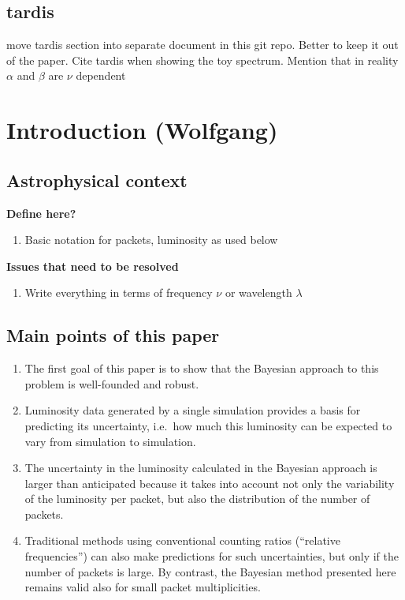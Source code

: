 \documentclass[11pt]{article}
\begin{document}
\subsection{tardis}

move tardis section into separate document in this git repo. Better to keep it out of the paper. Cite tardis when showing the toy spectrum. Mention that in reality $\alpha$ and $\beta$ are $\nu$ dependent

\section{Introduction (Wolfgang)}

\subsection{Astrophysical context}

\textbf{Define here?}
\begin{enumerate}
\item Basic notation for packets, luminosity as used below
\end{enumerate}

\textbf{Issues that need to be resolved}
\begin{enumerate}
\item Write everything in terms of frequency $\nu$ or wavelength $\lambda$
\end{enumerate}

\subsection*{Main points of this paper}

\begin{enumerate}
\item The first goal of this paper is to show that the Bayesian
  approach to this problem is well-founded and robust.

\item Luminosity data generated by a single simulation provides a
  basis for predicting its uncertainty, i.e.\ how much this luminosity
  can be expected to vary from simulation to simulation.

\item The uncertainty in the luminosity calculated in the Bayesian
  approach is larger than anticipated because it takes into account
  not only the variability of the luminosity per packet, but also the
  distribution of the number of packets.

\item Traditional methods using conventional counting ratios
  (``relative frequencies'') can also make predictions for such
  uncertainties, but only if the number of packets is large. By
  contrast, the Bayesian method presented here remains valid also for
  small packet multiplicities.

\end{enumerate}
\end{document}
